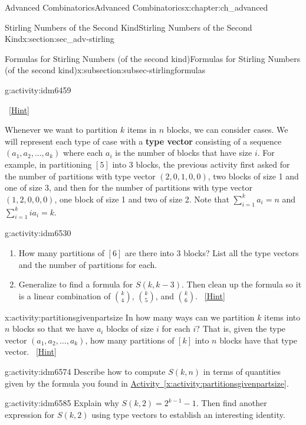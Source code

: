 \documentclass[oneside,10pt,]{book}
\newcommand{\terminology}[1]{\textbf{#1}}
\numberwithin{equation}{chapter}
\begin{document}
\begin{chapterptx}{Advanced Combinatorics}{}{Advanced Combinatorics}{}{}{x:chapter:ch_advanced}
\begin{sectionptx}{Stirling Numbers of the Second Kind}{}{Stirling Numbers of the Second Kind}{}{}{x:section:sec_adv-stirling}
\begin{subsectionptx}{Formulas for Stirling Numbers (of the second kind)}{}{Formulas for Stirling Numbers (of the second kind)}{}{}{x:subsection:subsec-stirlingformulas}
\begin{activity}{}{g:activity:idm6459}
\begin{enumerate}[font=\bfseries,label=(\alph*),ref=\alph*]
\qquad~\hfill{\tiny\hyperlink{g:hint:idm6505-back}{[Hint]}}\end{enumerate}
\end{activity}
 Whenever we want to partition \(k\) items in \(n\) blocks, we can consider cases.  We will represent each type of case with a \terminology{type vector} consisting of a sequence \((a_1, a_2, \ldots, a_k)\) where each \(a_i\) is the number of blocks that have size \(i\).  For example, in partitioning \([5]\) into 3 blocks, the previous activity first asked for the number of partitions with type vector \((2,0,1,0,0)\), two blocks of size 1 and one of size 3, and then for the number of partitions with type vector \((1,2,0,0,0)\), one block of size 1 and two of size 2.  Note that \(\sum_{i=1}^k a_i = n\) and \(\sum_{i=1}^k ia_i = k\).%
\begin{activity}{}{g:activity:idm6530}%
\begin{enumerate}[font=\bfseries,label=(\alph*),ref=\alph*]
\item{}How many partitions of \([6]\) are there into 3 blocks?  List all the type vectors and the number of partitions for each.%
\item{}Generalize to find a formula for \(S(k,k-3)\).  Then clean up the formula so it is a linear combination of \(\binom{k}{4}\), \(\binom{k}{5}\), and \(\binom{k}{6}\).%
\qquad~\hfill{\tiny\hyperlink{g:hint:idm6542-back}{[Hint]}}\end{enumerate}
\end{activity}
\begin{activity}{}{x:activity:partitionsgivenpartsize}%
In how many ways can we partition \(k\) items into \(n\) blocks so that we have \(a_i\) blocks of size \(i\) for each \(i\)? That is, given the type vector \((a_1, a_2, \ldots, a_k)\), how many partitions of \([k]\) into \(n\) blocks have that type vector.%
\qquad~\hfill{\tiny\hyperlink{g:hint:idm6556-back}{[Hint]}}\end{activity}
\begin{activity}{}{g:activity:idm6574}%
Describe how to compute \(S(k,n)\) in terms of quantities given by the formula you found in \hyperref[x:activity:partitionsgivenpartsize]{Activity~\ref{x:activity:partitionsgivenpartsize}}.%
\end{activity}
\begin{activity}{}{g:activity:idm6585}%
Explain why \(S(k, 2) = 2^{k-1} - 1\).  Then find another expression for \(S(k,2)\) using type vectors to establish an interesting identity.%

\end{activity}
\end{subsectionptx}
\end{sectionptx}
\end{chapterptx}
\end{document}
